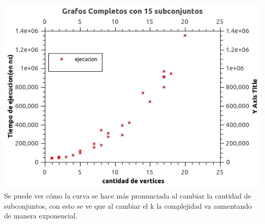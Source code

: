 \includegraphics[scale=0.5]{Ej2/k15.jpg}\\

Se puede ver cómo la curva se hace más pronunciada al cambiar la cantidad de subconjuntos, con esto se ve que al cambiar el k la complejidad va aumentando de manera exponencial.


